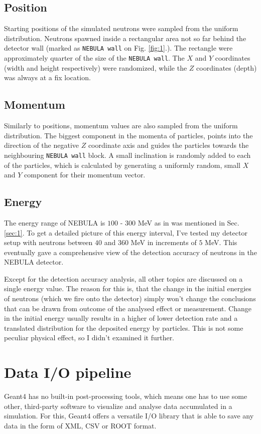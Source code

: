 \begin{multicols}{2}
\subsection{Position} \label{ssec:4.1}
Starting positions of the simulated neutrons were sampled from the uniform distribution. Neutrons spawned inside a rectangular area not so far behind the detector wall (marked as \texttt{NEBULA wall} on Fig. \ref{fig:1}.). The rectangle were approximately quarter of the size of the \texttt{NEBULA wall}. The $X$ and $Y$ coordinates (width and height respectively) were randomized, while the $Z$ coordinates (depth) was always at a fix location.

\subsection{Momentum} \label{ssec:4.2}
Similarly to positions, momentum values are also sampled from the uniform distribution. The biggest component in the momenta of particles, points into the direction of the negative $Z$ coordinate axis and guides the particles towards the neighbouring \texttt{NEBULA wall} block. A small inclination is randomly added to each of the particles, which is calculated by generating a uniformly random, small $X$ and $Y$ component for their momentum vector.

\subsection{Energy} \label{ssec:4.3}
The energy range of NEBULA is $100$ - $300$ MeV as in was mentioned in Sec. \ref{sec:1}. To get a detailed picture of this energy interval, I've tested my detector setup with neutrons between $40$ and $360$ MeV in increments of $5$ MeV. This eventually gave a comprehensive view of the detection accuracy of neutrons in the NEBULA detector.

Except for the detection accuracy analysis, all other topics are discussed on a single energy value. The reason for this is, that the change in the initial energies of neutrons (which we fire onto the detector) simply won't change the conclusions that can be drawn from outcome of the analysed effect or measurement. Change in the initial energy usually results in a higher of lower detection rate and a translated distribution for the deposited energy by particles. This is not some peculiar physical effect, so I didn't examined it further.

\section{Data I/O pipeline} \label{sec:5}
Geant4 has no built-in post-processing tools, which means one has to use some other, third-party software to visualize and analyse data accumulated in a simulation. For this, Geant4 offers a versatile I/O library that is able to save any data in the form of XML, CSV or ROOT format.


\end{multicols}
